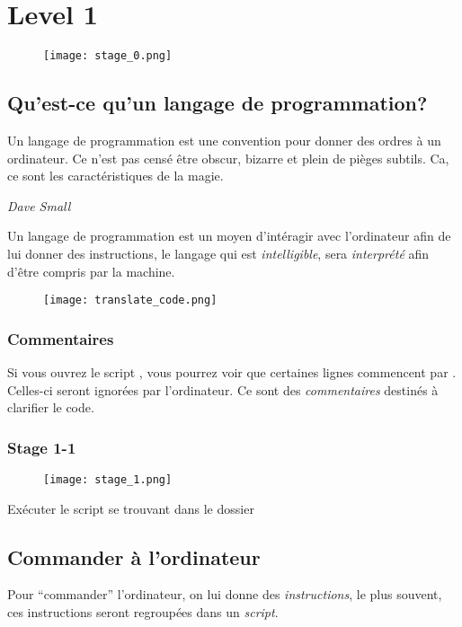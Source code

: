 \chapter{Level 1}
\begin{figure}[ht]
\texttt{[image: stage\_0.png]} 
\end{figure}

\section{Qu’est-ce qu’un langage de programmation?}

\epigraph{Un langage de programmation est une convention pour donner des ordres à un ordinateur. Ce n’est pas censé être obscur, bizarre et plein de pièges subtils.
Ca, ce sont les caractéristiques de la magie.}{\textit{Dave Small}}

Un langage de programmation est un moyen d’intéragir avec l’ordinateur afin de lui donner des instructions, le langage qui est \emph{intelligible}, 
sera \emph{interprété} afin d’être compris par la machine.

\begin{figure}[ht]
\centering
\texttt{[image: translate\_code.png]} 
\end{figure}

\subsection{Commentaires}

Si vous ouvrez le script , vous pourrez voir que certaines lignes commencent par \codeintext{\#}. Celles-ci seront ignorées par l'ordinateur. Ce sont des \emph{commentaires} destinés à clarifier le code.

\subsection{Stage 1-1}
\begin{figure}[ht]
\texttt{[image: stage\_1.png]} 
\end{figure}

Exécuter le script se trouvant dans le dossier 

\section{Commander à l'ordinateur}

Pour ``commander'' l’ordinateur, on lui donne des \emph{instructions}, le plus souvent, ces instructions seront regroupées dans un \emph{script}.

